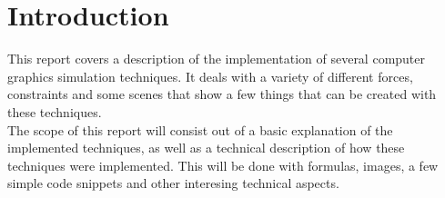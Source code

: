 \chapter{Introduction}

This report covers a description of the implementation of several computer graphics simulation techniques. It deals with a variety of different forces, constraints and some scenes that show a few things that can be created with these techniques. \\
The scope of this report will consist out of a basic explanation of the implemented techniques, as well as a technical description of how these techniques were implemented. This will be done with formulas, images, a few simple code snippets and other interesing technical aspects. 